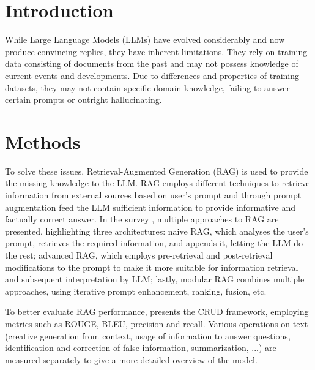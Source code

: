 \documentclass[fleqn,moreauthors,10pt]{ds_report}
\affiliation{\textit{Advisors: Aleš Žagar}}
\begin{document}
\flushbottom 

\maketitle 

\thispagestyle{empty} 


\section*{Introduction}
	
While Large Language Models (LLMs) have evolved considerably and now produce convincing replies, they have inherent limitations. They rely on training data consisting of documents from the past and may not possess knowledge of current events and developments. Due to differences and properties of training datasets, they may not contain specific domain knowledge, failing to answer certain prompts or outright hallucinating. 



\section*{Methods}

To solve these issues, Retrieval-Augmented Generation (RAG) is used to provide the missing knowledge to the LLM. RAG employs different techniques to retrieve information from external sources based on user’s prompt and through prompt augmentation feed the LLM sufficient information to provide informative and factually correct answer. In the survey \cite{survey}, multiple approaches to RAG are presented, highlighting three architectures: naive RAG, which analyses the user’s prompt, retrieves the required information, and appends it, letting the LLM do the rest; advanced RAG, which employs pre-retrieval and post-retrieval modifications to the prompt to make it more suitable for information retrieval and subsequent interpretation by LLM; lastly, modular RAG combines multiple approaches, using iterative prompt enhancement, ranking, fusion, etc. 


To better evaluate RAG performance, \cite{benchmark} presents the CRUD framework, employing metrics such as ROUGE, BLEU, precision and recall. Various operations on text (creative generation from context, usage of information to answer questions, identification and correction of false information, summarization, ...) are measured separately to give a more detailed overview of the model. 
\end{document}
